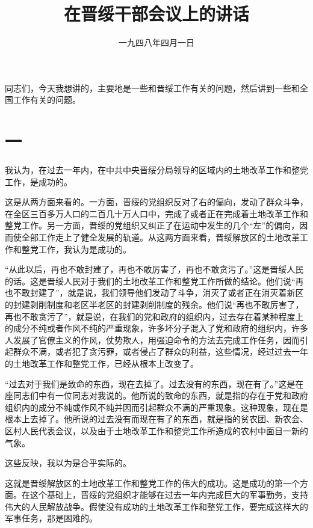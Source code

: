 
\title{在晋绥干部会议上的讲话}
\date{一九四八年四月一日}
\maketitle


同志们，今天我想讲的，主要地是一些和晋绥工作有关的问题，然后讲到一些和全国工作有关的问题。

\section*{一}

我认为，在过去一年内，在中共中央晋绥分局领导的区域内的土地改革工作和整党工作，是成功的。

这是从两方面来看的。一方面，晋绥的党组织反对了右的偏向，发动了群众斗争，在全区三百多万人口的二百几十万人口中，完成了或者正在完成着土地改革工作和整党工作。另一方面，晋绥的党组织又纠正了在运动中发生的几个“左”的偏向，因而使全部工作走上了健全发展的轨道。从这两方面来看，晋绥解放区的土地改革工作和整党工作，我认为是成功的。

“从此以后，再也不敢封建了，再也不敢厉害了，再也不敢贪污了。”这是晋绥人民的话。这是晋绥人民对于我们的土地改革工作和整党工作所做的结论。他们说“再也不敢封建了”，就是说，我们领导他们发动了斗争，消灭了或者正在消灭着新区的封建剥削制度和老区半老区的封建剥削制度的残余。他们说“再也不敢厉害了，再也不敢贪污了”，就是说，在我们的党和政府的组织内，过去存在着某种程度上的成分不纯或者作风不纯的严重现象，许多坏分子混入了党和政府的组织内，许多人发展了官僚主义的作风，仗势欺人，用强迫命令的方法去完成工作任务，因而引起群众不满，或者犯了贪污罪，或者侵占了群众的利益，这些情况，经过过去一年的土地改革工作和整党工作，已经从根本上改变了。

“过去对于我们是致命的东西，现在去掉了。过去没有的东西，现在有了。”这是在座同志们中有一位同志对我说的。他所说的致命的东西，就是指的存在于党和政府组织内的成分不纯或作风不纯并因而引起群众不满的严重现象。这种现象，现在是根本上去掉了。他所说的过去没有而现在有了的东西，就是指的贫农团、新农会、区村人民代表会议，以及由于土地改革工作和整党工作所造成的农村中面目一新的气象。

这些反映，我以为是合乎实际的。

这就是晋绥解放区的土地改革工作和整党工作的伟大的成功。这是成功的第一个方面。在这个基础上，晋绥的党组织才能够在过去一年内完成巨大的军事勤务，支持伟大的人民解放战争。假使没有成功的土地改革工作和整党工作，要完成这样大的军事任务，那是困难的。

